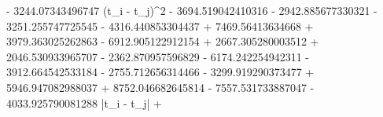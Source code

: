 - 3244.07343496747 \left(t_{i} - t_{j}\right)^{2} - 3694.519042410316  - 2942.885677330321  - 3251.255747725545  - 4316.440853304437  + 7469.56413634668  + 3979.363025262863  - 6912.905122912154  + 2667.305280003512  + 2046.530933965707  - 2362.870957596829  - 6174.242254942311  - 3912.664542533184  - 2755.712656314466  - 3299.919290373477  + 5946.947082988037  + 8752.046682645814  - 7557.531733887047  - 4033.925790081288 \left|{t_{i} - t_{j}}\right| + 
